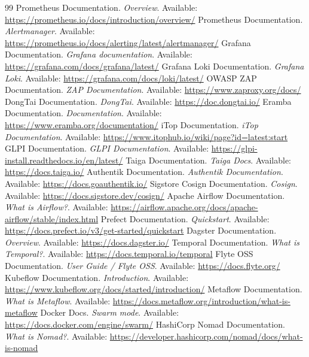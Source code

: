 \documentclass[10pt,letterpaper]{article}
\begin{document}
\begin{thebibliography}{99}
 Prometheus Documentation. \emph{Overview}. Available: \url{https://prometheus.io/docs/introduction/overview/}
 Prometheus Documentation. \emph{Alertmanager}. Available: \url{https://prometheus.io/docs/alerting/latest/alertmanager/}
 Grafana Documentation. \emph{Grafana documentation}. Available: \url{https://grafana.com/docs/grafana/latest/}
 Grafana Loki Documentation. \emph{Grafana Loki}. Available: \url{https://grafana.com/docs/loki/latest/}
 OWASP ZAP Documentation. \emph{ZAP Documentation}. Available: \url{https://www.zaproxy.org/docs/}
 DongTai Documentation. \emph{DongTai}. Available: \url{https://doc.dongtai.io/}
 Eramba Documentation. \emph{Documentation}. Available: \url{https://www.eramba.org/documentation/}
 iTop Documentation. \emph{iTop Documentation}. Available: \url{https://www.itophub.io/wiki/page?id=latest:start}
 GLPI Documentation. \emph{GLPI Documentation}. Available: \url{https://glpi-install.readthedocs.io/en/latest/}
 Taiga Documentation. \emph{Taiga Docs}. Available: \url{https://docs.taiga.io/}
 Authentik Documentation. \emph{Authentik Documentation}. Available: \url{https://docs.goauthentik.io/}
 Sigstore Cosign Documentation. \emph{Cosign}. Available: \url{https://docs.sigstore.dev/cosign/}
 Apache Airflow Documentation. \emph{What is Airflow?}. Available: \url{https://airflow.apache.org/docs/apache-airflow/stable/index.html}
 Prefect Documentation. \emph{Quickstart}. Available: \url{https://docs.prefect.io/v3/get-started/quickstart}
 Dagster Documentation. \emph{Overview}. Available: \url{https://docs.dagster.io/}
 Temporal Documentation. \emph{What is Temporal?}. Available: \url{https://docs.temporal.io/temporal}
 Flyte OSS Documentation. \emph{User Guide / Flyte OSS}. Available: \url{https://docs.flyte.org/}
 Kubeflow Documentation. \emph{Introduction}. Available: \url{https://www.kubeflow.org/docs/started/introduction/}
 Metaflow Documentation. \emph{What is Metaflow}. Available: \url{https://docs.metaflow.org/introduction/what-is-metaflow}
 Docker Docs. \emph{Swarm mode}. Available: \url{https://docs.docker.com/engine/swarm/}
 HashiCorp Nomad Documentation. \emph{What is Nomad?}. Available: \url{https://developer.hashicorp.com/nomad/docs/what-is-nomad}
\end{thebibliography}
\end{document}
